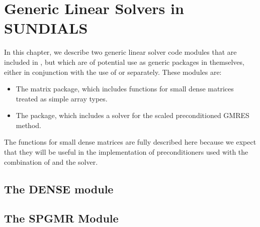 \chapter{Generic Linear Solvers in SUNDIALS}\label{s:gen_linsolv}
In this chapter, we describe two generic linear solver code modules that 
are included in {\sundials}, but which are of potential use as generic packages in
themselves, either in conjunction with the use of {\kinsol} or separately.
These modules are:
\begin{itemize}
\item The {\dense} matrix package, which includes functions
      for small dense matrices treated as simple array types.
\item The {\spgmr} package, which includes a solver for the scaled
      preconditioned GMRES method.
\end{itemize}

The functions for small dense matrices are fully
described here because we expect that they will be useful in the
implementation of preconditioners used with the combination of {\kinsol}
and the {\kinspgmr} solver.

\section{The DENSE module}\label{ss:dense}


\section{The SPGMR Module}\label{ss:spgmr}


